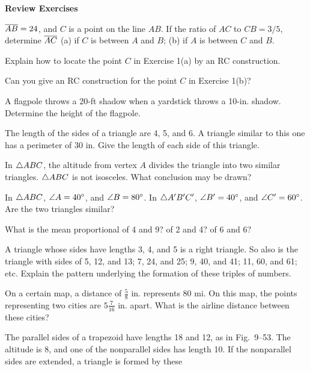 \documentclass[11pt]{book}
\begin{document}
\begin{center}\bfseries Review Exercises\end{center}

\begin{exlist}
\item $\overline{AB} = 24$, and $C$ is a point on the line $AB$. If the ratio of $AC$
      to $CB = 3/5$, determine $\overline{AC}$ (a) if $C$ is between $A$ and $B$;
      (b) if $A$ is between $C$ and $B$.
\item Explain how to locate the point $C$ in Exercise 1(a) by an RC
      construction.
\item[\stex 3.] Can you give an RC construction for the point $C$ in Exercise
      1(b)?
\item[4.] A flagpole throws a 20-ft shadow when a yardstick throws a 10-in.
      shadow. Determine the height of the flagpole.
\item[5.] The length of the sides of a triangle are 4, 5, and 6. A triangle
      similar to this one has a perimeter of 30 in. Give the length of each side
      of this triangle.
\item[6.] In $\triangle ABC$, the altitude from vertex $A$ divides the triangle into
      two similar triangles. $\triangle ABC$ is not isosceles. What conclusion may
      be drawn?
\item[7.] In $\triangle ABC$, $\angle A = 40^\circ$, and $\angle B = 80^\circ$. In
      $\triangle A'B'C'$, $\angle B' = 40^\circ$, and $\angle C' = 60^\circ$. Are the
      two triangles similar?
\item[8.] What is the mean proportional of 4 and 9? of 2 and 4? of 6 and 6?
\item[9.] A triangle whose sides have lengths 3, 4, and 5 is a right triangle.
      So also is the triangle with sides of 5, 12, and 13; 7, 24, and 25; 9, 40,
      and 41; 11, 60, and 61; etc. Explain the pattern underlying the formation
      of these triples of numbers.
\item[10.] On a certain map, a distance of $\frac{5}{8}$ in. represents 80 mi.
      On this map, the points representing two cities are $5\frac{7}{16}$ in.
      apart. What is the airline distance between these cities?
\item[11.] The parallel sides of a trapezoid have lengths 18 and 12, as in
      Fig.~9--53. The altitude is 8, and one of the nonparallel sides has length
      10. If the nonparallel sides are extended, a triangle is formed by these

\end{exlist}
\end{document}
